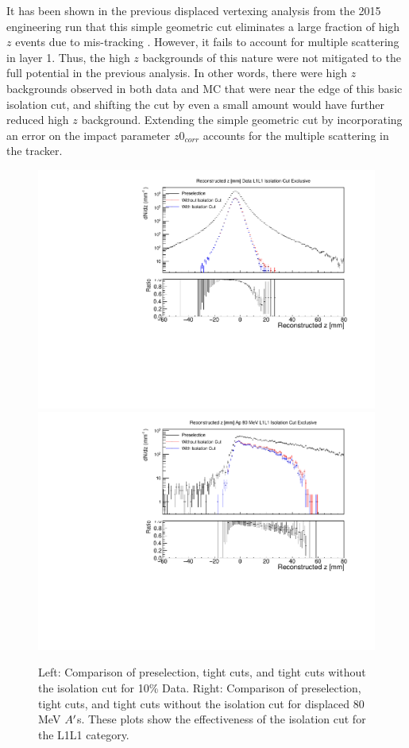 It has been shown in the previous displaced vertexing analysis from the 2015 engineering run that this simple geometric cut eliminates a large fraction of high $z$ events due to mis-tracking \cite{adrian2018search}. However, it fails to account for multiple scattering in layer 1. Thus, the high $z$ backgrounds of this nature were not mitigated to the full potential in the previous analysis. In other words, there were high $z$ backgrounds observed in both data and MC that were near the edge of this basic isolation cut, and shifting the cut by even a small amount would have further reduced high $z$ background. Extending the simple geometric cut by incorporating an error on the impact parameter $z0_{corr}$ accounts for the multiple scattering in the tracker.

\begin{figure}[!ht] 
    \centering
    \includegraphics[width=.45\textwidth]{figs/selection/isocut_n_1_z.pdf}
    \includegraphics[width=.45\textwidth]{figs/selection/ap_80MeV_isocut_n_1_z.pdf}
    \caption{
    	Left: Comparison of preselection, tight cuts, and tight cuts without the isolation cut for 10\% Data. Right: Comparison of preselection, tight cuts, and tight cuts without the isolation cut for displaced 80 MeV $A^\prime$s. These plots show the effectiveness of the isolation cut for the L1L1 category.
    }
    \label{fig:isocut_L1L1}
\end{figure} 

